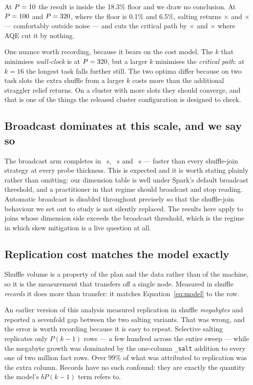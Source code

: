 At $P=10$ the result is inside the 18.3\% floor and we draw no conclusion.
At $P=100$ and $P=320$, where the floor is 0.1\% and 6.5\%, salting
returns \SaltSpeedupMid$\times$ and \SaltSpeedupThick$\times$ --- comfortably
outside noise --- and cuts the critical path by \SaltTaskCutMid$\times$ and
\SaltTaskCutThick$\times$ where AQE cut it by nothing.

One nuance worth recording, because it bears on the cost model. The $k$ that
minimises \emph{wall-clock} is \SaltBestKThick{} at $P=320$, but a larger
$k$ minimises the \emph{critical path}: at $k=16$ the longest task falls
further still. The two optima differ because on two task slots the extra
shuffle from a larger $k$ costs more than the additional straggler relief
returns. On a cluster with more slots they should converge, and that is one of
the things the released cluster configuration is designed to check.

\subsection{Broadcast dominates at this scale, and we say so}

The broadcast arm completes in \BcastWallThin~s, \BcastWallMid~s and
\BcastWallThick~s --- faster than every shuffle-join strategy at every probe
thickness. This is expected and it is worth stating plainly rather than
omitting: our dimension table is well under Spark's default broadcast
threshold, and a practitioner in that regime should broadcast and stop reading.
Automatic broadcast is disabled throughout precisely so that the shuffle-join
behaviour we set out to study is not silently replaced. The results here apply
to joins whose dimension side exceeds the broadcast threshold, which is the
regime in which skew mitigation is a live question at all.

\subsection{Replication cost matches the model exactly}

Shuffle volume is a property of the plan and the data rather than of the
machine, so it is the measurement that transfers off a single node. Measured in
shuffle \emph{records} it does more than transfer: it matches
Equation~\eqref{eq:model} to the row.

An earlier version of this analysis measured replication in shuffle
\emph{megabytes} and reported a sevenfold gap between the two salting variants.
That was wrong, and the error is worth recording because it is easy to repeat.
Selective salting replicates only $P(k-1)$ rows --- a few hundred across the
entire sweep --- while the megabyte growth was dominated by the one-column
\texttt{\_salt} addition to every one of two million fact rows. Over 99\% of
what was attributed to replication was the extra column. Records have no such
confound: they are exactly the quantity the model's $bP(k-1)$ term refers to.

